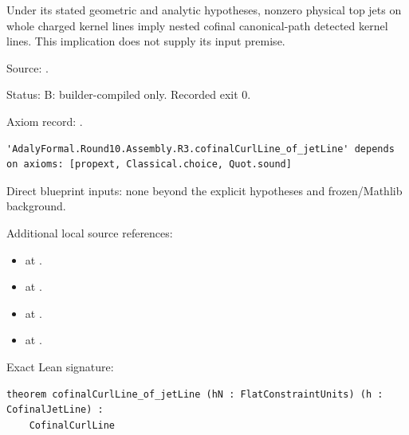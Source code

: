 \begin{theorem}[bp-322]
\label{bp-322}
\uses{}
\leanok
Under its stated geometric and analytic hypotheses, nonzero physical top jets on whole charged kernel lines imply nested cofinal canonical-path detected kernel lines. This implication does not supply its input premise.

\par Source: \texttt{}.
\par Status: B: builder-compiled only. Recorded exit 0.
\par Axiom record: \texttt{}.
\begin{verbatim}
'AdalyFormal.Round10.Assembly.R3.cofinalCurlLine_of_jetLine' depends on axioms: [propext, Classical.choice, Quot.sound]
\end{verbatim}
\par Direct blueprint inputs: none beyond the explicit hypotheses and frozen/Mathlib background.
\par Additional local source references:
\begin{itemize}
\item \texttt{} at \texttt{}.
\item \texttt{} at \texttt{}.
\item \texttt{} at \texttt{}.
\item \texttt{} at \texttt{}.
\end{itemize}
\par Exact Lean signature:
\begin{verbatim}
theorem cofinalCurlLine_of_jetLine (hN : FlatConstraintUnits) (h : CofinalJetLine) :
    CofinalCurlLine
\end{verbatim}
\end{theorem}

